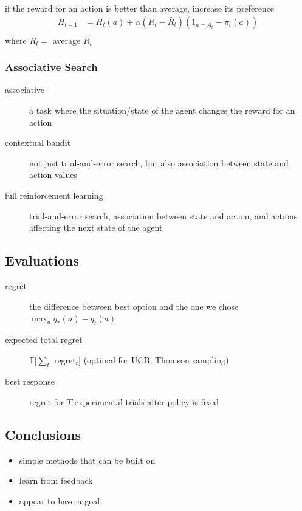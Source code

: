 \documentclass[]{article}
\theoremstyle{definition}
\newcommand{\E}{\mathbb{E}}
\begin{document}
if the reward for an action is better than average, increase its preference
\begin{eqnarray*}
    H_{t+1} &= H_t(a) + \alpha(R_t - \bar R_t)(1_{a = A_t} - \pi_t(a)) \\
\end{eqnarray*}
where $\bar R_t = $ average $R_i$

\subsubsection{Associative Search}
\label{ssub:associative_search}

\begin{description}
    \item[associative] a task where the situation/state of the agent changes the reward for an action
    \item[contextual bandit] not just trial-and-error search, but also association between state and action values
    \item[full reinforcement learning] trial-and-error search, association between state and action, and actions affecting the next state of the agent
\end{description}


\subsection{Evaluations}
\label{sub:evaluations}
\begin{description}
    \item[regret] the difference between best option and the one we chose $\max_a q_*(a) - q_t(a)$
    \item[expected total regret] $\E[\sum_t $ regret$_t]$ (optimal for UCB, Thomson sampling)
    \item[best response] regret for $T$ experimental trials after policy is fixed
\end{description}

\subsection{Conclusions}
\label{sub:conclusions}
\begin{itemize}
    \item simple methods that can be built on
    \item learn from feedback
    \item appear to have a goal
\end{itemize}
\end{document}

